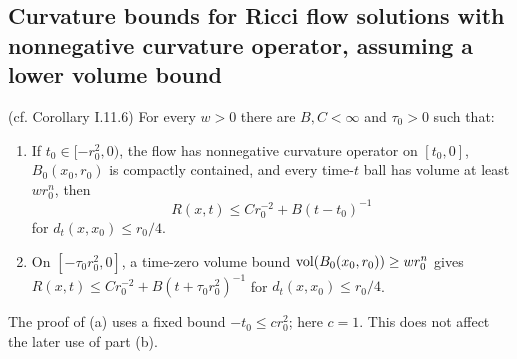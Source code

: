 \subsection{Curvature bounds for Ricci flow solutions with nonnegative curvature operator, assuming a lower volume bound}
\begin{corollary}
\label{cor:kl-curvature-bounds-ricci-flow-solutions-nonnegative-curvature-operator-ass-existence-curvature-operators}

(cf. Corollary I.11.6) \label{corI.11.6}
For every $w>0$ there are $B,C<\infty$ and $\tau_0>0$ such that:
\begin{enumerate}
\item If $t_0\in[-r_0^2,0)$, the flow has nonnegative curvature operator on
$[t_0,0]$, $B_0(x_0,r_0)$ is compactly contained, and every time-$t$ ball
has volume at least $wr_0^n$, then
\begin{equation}\label{Rbound3}
R(x,t)\leq Cr_0^{-2}+B(t-t_0)^{-1}
\end{equation}
for $d_t(x,x_0)\leq r_0/4$.
\item On $[-\tau_0r_0^2,0]$, a time-zero volume bound
$\operatorname{vol}(B_0(x_0,r_0))\geq wr_0^n$ gives
$R(x,t)\leq Cr_0^{-2}+B(t+\tau_0r_0^2)^{-1}$ for $d_t(x,x_0)\leq r_0/4$.
\end{enumerate}
\end{corollary}
\begin{remark}
\label{rem:kl-curvature-bounds-ricci-flow-solutions-nonnegative-curvature-operator-ass-structural-remark-curvature-operators}


The proof of (a) uses a fixed bound $-t_0\leq cr_0^2$; here $c=1$.
This does not affect the later use of part (b).
\end{remark}

